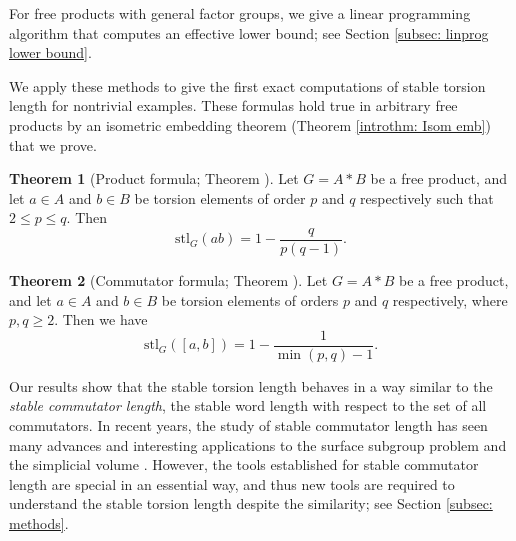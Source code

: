 \documentclass{amsart}
\theoremstyle{definition}
\numberwithin{equation}{section}
\theoremstyle{theorem}
\newtheorem{theoremA}{Theorem}
\theoremstyle{remark}
\def\stl{\mathrm{stl}}
\begin{document}
	For free products with general factor groups, we give a linear programming algorithm that computes an effective lower bound; see Section \ref{subsec: linprog lower bound}.
	
	We apply these methods to give the first exact computations of stable torsion length for nontrivial examples. 
	These formulas hold true in arbitrary free products by an isometric embedding theorem (Theorem \ref{introthm: Isom emb}) that we prove.
	
	\begin{theoremA}[Product formula; Theorem \protect{\ref{thm: product formula}}]\label{introthm: product formula}
	    Let $G=A*B$ be a free product, and let $a\in A$ and $b\in B$ be torsion elements of order $p$ and $q$ respectively such that $2\leq p\leq q$. Then 
		$$\stl_G(ab)=1-\frac{q}{p(q-1)}.$$
	\end{theoremA}
	
	\begin{theoremA}[Commutator formula; Theorem \protect{\ref{thm: compute abAB}}]\label{introthm: compute abAB}
	    Let $G=A*B$ be a free product, and let $a\in A$ and $b\in B$ be torsion elements of orders $p$ and $q$ respectively, where $p,q\ge2$. Then we have
	    $$\stl_G([a,b])=1-\frac{1}{\min(p,q)-1}.$$
	\end{theoremA}
	
	Our results show that the stable torsion length behaves in a way similar to the \emph{stable commutator length}, the stable word length with respect to the set of all commutators. In recent years, the study of stable commutator length has seen many advances \cite{Cal:rational,Chen:sclBS} and interesting applications to the surface subgroup problem \cite{Cal:surfsubgrp,CW:surfsubgrp,Wilton} and the simplicial volume \cite{HL:simpvol}. However, the tools established for stable commutator length are special in an essential way, and thus new tools are required to understand the stable torsion length despite the similarity; see Section \ref{subsec: methods}.
	
	
\end{document}
